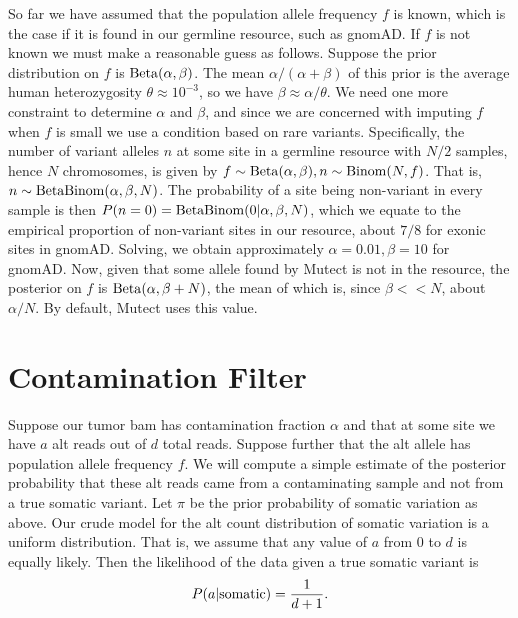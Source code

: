\documentclass[nofootinbib,amssymb,amsmath]{revtex4}
\begin{document}
So far we have assumed that the population allele frequency $f$ is known, which is the case if it is found in our germline resource, such as gnomAD.  If $f$ is not known we must make a reasonable guess as follows.  Suppose the prior distribution on $f$ is ${\rm Beta}(\alpha, \beta)$.  The mean $\alpha/(\alpha +\beta)$ of this prior is the average human heterozygosity $\theta \approx 10^{-3}$, so we have $\beta \approx \alpha / \theta$.  We need one more constraint to determine $\alpha$ and $\beta$, and since we are concerned with imputing $f$ when $f$ is small we use a condition based on rare variants.  Specifically, the number of variant alleles $n$ at some site in a germline resource with $N/2$ samples, hence $N$ chromosomes, is given by $f \sim {\rm Beta}(\alpha, \beta), n \sim {\rm Binom}(N,f)$.  That is, $n \sim {\rm BetaBinom}(\alpha, \beta, N)$.  The probability of a site being non-variant in every sample is then $P(n = 0) = {\rm BetaBinom}(0 | \alpha, \beta, N)$, which we equate to the empirical proportion of non-variant sites in our resource, about $7/8$ for exonic sites in gnomAD.  Solving, we obtain approximately $\alpha = 0.01, \beta = 10$ for gnomAD.  Now, given that some allele found by Mutect is not in the resource, the posterior on $f$ is ${\rm Beta}(\alpha, \beta + N)$, the mean of which is, since $\beta << N$, about $\alpha / N$.  By default, Mutect uses this value.

\section{Contamination Filter}\label{contamination-filter}
Suppose our tumor bam has contamination fraction $\alpha$ and that at some site we have $a$ alt reads out of $d$ total reads.  Suppose further that the alt allele has population allele frequency $f$.  We will compute a simple estimate of the posterior probability that these alt reads came from a contaminating sample and not from a true somatic variant.  Let $\pi$ be the prior probability of somatic variation as above.  Our crude model for the alt count distribution of somatic variation is a uniform distribution.  That is, we assume that any value of $a$ from $0$ to $d$ is equally likely.  Then the likelihood of the data given a true somatic variant is
\begin{equation}
P(a | {\rm somatic})  = \frac{1}{d + 1}.
\end{equation}
\end{document}

